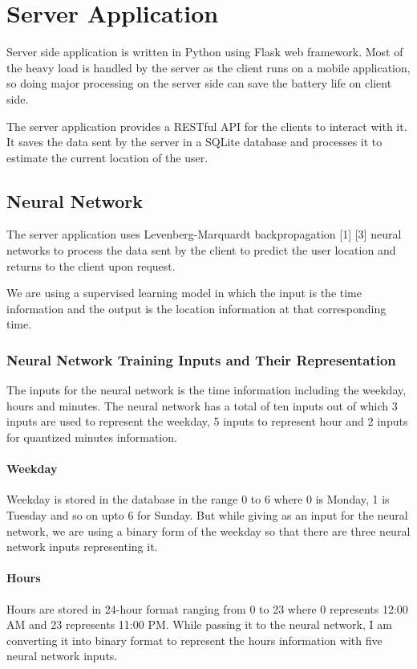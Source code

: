 \documentclass[conference]{IEEEtran}
\begin{document}

\section{Server Application}
Server side application is written in Python using Flask web framework. Most of the heavy load is handled by the server as the client runs on a mobile application, so doing major processing on the server side can save the battery life on client side.

The server application provides a RESTful API for the clients to interact with it. It saves the data sent by the server in  a SQLite database and processes it to estimate the current location of the user.

\subsection{Neural Network}
The server application uses Levenberg-Marquardt backpropagation [1] [3] neural networks to process the data sent by the client to predict the user location and returns to the client upon request.

We are using a supervised learning model in which the input is the time information and the output is the location information at that corresponding time.

\subsubsection{Neural Network Training Inputs and Their Representation}
The inputs for the neural network is the time information including the weekday, hours and minutes.
The neural network has a total of ten inputs out of which 3 inputs are used to represent the weekday, 5 inputs to represent hour and 2 inputs for quantized minutes information.
\paragraph{Weekday}
Weekday is stored in the database in the range 0 to 6 where 0 is Monday, 1 is Tuesday and so on upto 6 for Sunday.
But while giving as an input for the neural network, we are using a binary form of the weekday so that there are three neural network inputs representing it.
\paragraph{Hours}
Hours are stored in 24-hour format ranging from 0 to 23 where 0 represents 12:00 AM and 23 represents 11:00 PM.
While passing it to the neural network, I am converting it into binary format to represent the hours information with five neural network inputs.
\end{document}
